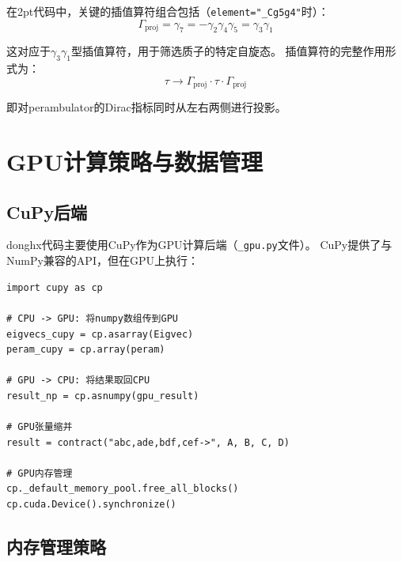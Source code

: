 \documentclass[12pt,a4paper]{ctexart}
\begin{document}
\begin{physbox}[插值算符与质子量子数]
在2pt代码中，关键的插值算符组合包括（\texttt{element="\_Cg5g4"}时）：
\begin{equation}
    \Gamma_{\text{proj}} = \gamma_7 = -\gamma_2\gamma_4\gamma_5 = \gamma_3\gamma_1
    \label{eq:interpolator}
\end{equation}

这对应于$\gamma_3\gamma_1$型插值算符，用于筛选质子的特定自旋态。
插值算符的完整作用形式为：
\begin{equation}
    \tau \to \Gamma_{\text{proj}} \cdot \tau \cdot \Gamma_{\text{proj}}
\end{equation}

即对perambulator的Dirac指标同时从左右两侧进行投影。
\end{physbox}

\section{GPU计算策略与数据管理}

\subsection{CuPy后端}

donghx代码主要使用CuPy作为GPU计算后端（\texttt{\_gpu.py}文件）。
CuPy提供了与NumPy兼容的API，但在GPU上执行：

\begin{codebox}
\begin{lstlisting}[style=pythonstyle]
import cupy as cp

# CPU -> GPU: 将numpy数组传到GPU
eigvecs_cupy = cp.asarray(Eigvec)
peram_cupy = cp.array(peram)

# GPU -> CPU: 将结果取回CPU
result_np = cp.asnumpy(gpu_result)

# GPU张量缩并
result = contract("abc,ade,bdf,cef->", A, B, C, D)

# GPU内存管理
cp._default_memory_pool.free_all_blocks()
cp.cuda.Device().synchronize()
\end{lstlisting}
\end{codebox}

\subsection{内存管理策略}
\end{document}
